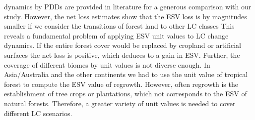 dynamics by \acp{PDD} are provided in literature for a generous comparison with our study. However, the net loss estimates show that the \ac{ESV} loss is by magnitudes smaller if we consider the transitions of forest land to other \ac{LC} classes This reveals a fundamental problem of applying \ac{ESV} unit values to \ac{LC} change dynamics. If the entire forest cover would be replaced by cropland or artificial surfaces the net loss is positive, which deduces to a gain in \ac{ESV}. Further, the coverage of different biomes by unit values is not diverse enough. In Asia/Australia and the other continents we had to use the unit value of tropical forest to compute the \ac{ESV} value of regrowth. However, often regrowth is the establishment of tree crops or plantations, which not corresponds to the \ac{ESV} of natural forests. Therefore, a greater variety of unit values is needed to cover different \ac{LC} scenarios.
